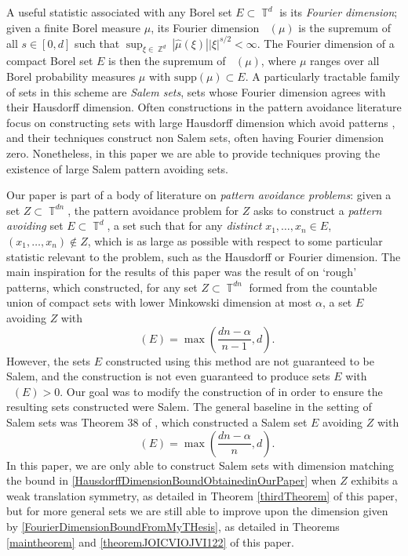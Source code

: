 \documentclass[dvipsnames,letterpaper,12pt]{article}
\numberwithin{equation}{section}
\DeclareMathOperator{\hausdim}{\dim_{\mathbb{H}}}
\DeclareMathOperator{\fordim}{\dim_{\mathbb{F}}}
\DeclareMathOperator{\ZZ}{\mathbb{Z}}
\DeclareMathOperator{\TT}{\mathbb{T}}
\numberwithin{theorem}{section}
\begin{document}

A useful statistic associated with any Borel set $E \subset \TT^d$ is its \emph{Fourier dimension}; given a finite Borel measure $\mu$, its Fourier dimension $\fordim(\mu)$ is the supremum of all $s \in [0,d]$ such that $\sup_{\xi \in \ZZ^d} |\widehat{\mu}(\xi)| |\xi|^{s/2} < \infty$. The Fourier dimension of a compact Borel set $E$ is then the supremum of $\fordim(\mu)$, where $\mu$ ranges over all Borel probability measures $\mu$ with $\text{supp}(\mu) \subset E$. A particularly tractable family of sets in this scheme are \emph{Salem sets}, sets whose Fourier dimension agrees with their Hausdorff dimension. Often constructions in the pattern avoidance literature focus on constructing sets with large Hausdorff dimension which avoid patterns \cite{OurPaper,PramanikFraser,Mathe}, and their techniques construct non Salem sets, often having Fourier dimension zero. Nonetheless, in this paper we are able to provide techniques proving the existence of large Salem pattern avoiding sets.

Our paper is part of a body of literature on \emph{pattern avoidance problems}: given a set $Z \subset \TT^{dn}$, the pattern avoidance problem for $Z$ asks to construct a \emph{pattern avoiding} set $E \subset \TT^d$, a set such that for any \emph{distinct} $x_1,\dots,x_n \in E$, $(x_1,\dots,x_n) \not \in Z$, which is as large as possible with respect to some particular statistic relevant to the problem, such as the Hausdorff or Fourier dimension. The main inspiration for the results of this paper was the result of \cite{OurPaper} on `rough' patterns, which constructed, for any set $Z \subset \TT^{dn}$ formed from the countable union of compact sets with lower Minkowski dimension at most $\alpha$, a set $E$ avoiding $Z$ with
%
\begin{equation} \label{HausdorffDimensionBoundObtainedinOurPaper}
    \hausdim(E) = \max\left( \frac{dn - \alpha}{n - 1}, d \right).
\end{equation}
%
However, the sets $E$ constructed using this method are not guaranteed to be Salem, and the construction is not even guaranteed to produce sets $E$ with $\fordim(E) > 0$. Our goal was to modify the construction of \cite{OurPaper} in order to ensure the resulting sets constructed were Salem. The general baseline in the setting of Salem sets was Theorem 38 of \cite{MyThesis}, which constructed a Salem set $E$ avoiding $Z$ with
%
\begin{equation} \label{FourierDimensionBoundFromMyTHesis}
    \fordim(E) = \max \left( \frac{dn - \alpha}{n}, d \right).
\end{equation}
%
In this paper, we are only able to construct Salem sets with dimension matching the bound in \eqref{HausdorffDimensionBoundObtainedinOurPaper} when $Z$ exhibits a weak translation symmetry, as detailed in Theorem \ref{thirdTheorem} of this paper, but for more general sets we are still able to improve upon the dimension given by \eqref{FourierDimensionBoundFromMyTHesis}, as detailed in Theorems \ref{maintheorem} and \ref{theoremJOICVIOJVI122} of this paper.
\end{document}
